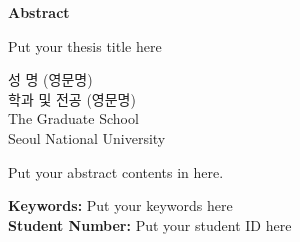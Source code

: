 \clearpage
\thispagestyle{empty}

\begin{center}
    {\bfseries\fontsize{16pt}{16pt}\selectfont Abstract}
    \vspace{1em}
    
    {\fontsize{22pt}{22pt}\selectfont Put your thesis title here}
    \vspace{1.5em}
\end{center}

\begin{flushright}
    {\fontsize{14pt}{14pt}\selectfont 성 명 (영문명)}\\[1em]
    {\fontsize{14pt}{14pt}\selectfont 학과 및 전공 (영문명)}\\[1em]
    {\fontsize{14pt}{14pt}\selectfont The Graduate School}\\[1em]
    {\fontsize{14pt}{14pt}\selectfont Seoul National University}
\end{flushright}

\vspace{2em}

{\fontsize{11pt}{11pt}\selectfont
\setlength{\parindent}{0pt}

\par
Put your abstract contents in here.
\vspace{2em}

\noindent
\textbf{Keywords:} Put your keywords here\\[0.5em]
\textbf{Student Number:} Put your student ID here

}

\clearpage
